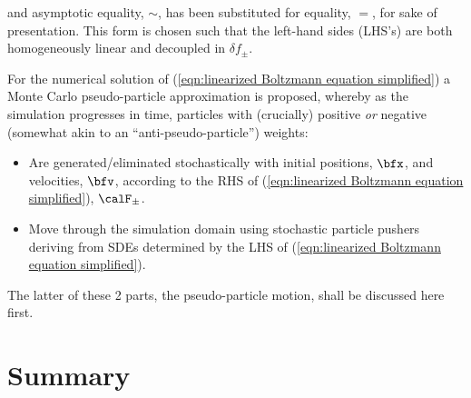     and asymptotic equality, $\sim$, has been substituted for equality, $=$, for sake of presentation. This form is chosen such that the left-hand sides (LHS's) are both homogeneously linear and decoupled in $\delta\!f_{\pm}$.


    For the numerical solution of (\ref{eqn:linearized Boltzmann equation simplified}) a Monte Carlo pseudo-particle approximation is proposed, whereby as the simulation progresses in time, particles with (crucially) positive \emph{or} negative (somewhat akin to an ``anti-pseudo-particle'') weights:
    \begin{itemize}
        \item  Are generated/eliminated stochastically with initial positions, $\bfx$, and velocities, $\bfv$, according to the RHS of (\ref{eqn:linearized Boltzmann equation simplified}), $\calF_{\pm}$.
        \item  Move through the simulation domain using stochastic particle pushers deriving from SDEs determined by the LHS of (\ref{eqn:linearized Boltzmann equation simplified}).
    \end{itemize}
    The latter of these 2 parts, the pseudo-particle motion, shall be discussed here first.



    
    



    \section*{Summary}
    